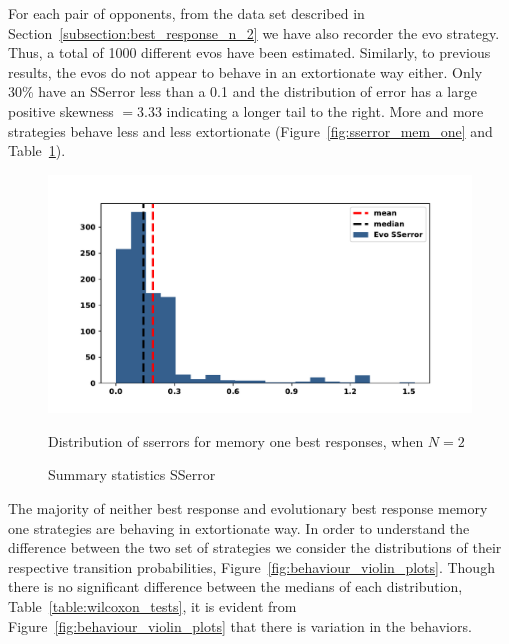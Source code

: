 \documentclass[10pt]{article}
\begin{document}
For each pair of opponents, from the data set described in
Section~\ref{subsection:best_response_n_2} we have also recorder the evo
strategy. Thus, a total of 1000 different evos have been estimated. Similarly,
to previous results, the evos do not appear to behave in an extortionate way
either. Only 30\% have an SSerror less than a 0.1 and the distribution of error
has a large positive skewness \(=3.33\) indicating a longer tail to the right.
More and more strategies behave less and less extortionate
(Figure~\ref{fig:sserror_mem_one} and Table~\ref{table:sserror_stats}).

\begin{figure}
    \begin{minipage}{0.69\textwidth}
            \begin{center}
            \includegraphics[width=.85\linewidth]{img/evo_sserror.pdf}
            \end{center}
            \caption{Distribution of sserrors for memory one best responses, when \(N=2\)}
            \label{fig:sserror_mem_one}
    \end{minipage}
    \hfill
    \begin{minipage}{0.29\textwidth}
        \centering
        \captionsetup{type=table}
        \resizebox{.61\columnwidth}{!}{%
            }
            \caption{Summary statistics SSerror}
            \label{table:sserror_stats}
      \end{minipage}
\end{figure}

The majority of neither best response and evolutionary best response memory one
strategies are behaving in extortionate way. In order to understand the difference
between the two set of strategies we consider the distributions of their respective
transition probabilities, Figure~\ref{fig:behaviour_violin_plots}.
Though there is no significant difference between the medians of each
distribution, Table~\ref{table:wilcoxon_tests}, it is evident from Figure~\ref{fig:behaviour_violin_plots}
that there is variation in the behaviors.
\end{document}
